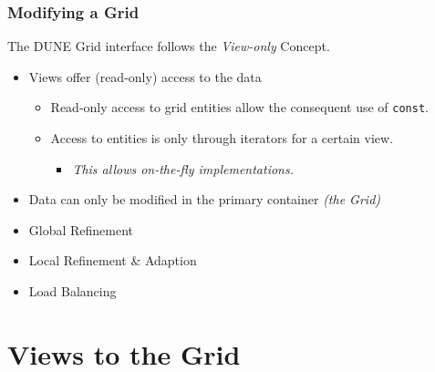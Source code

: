 \documentclass[aspectratio=169,11pt]{beamer}
\theoremstyle{definition}
\begin{document}
\begin{frame} \frametitle{Modifying a Grid}
  The DUNE Grid interface follows the \emph{View-only} Concept.
  \pause
  \begin{itemize}
  \item Views offer (read-only) access to the data
    \begin{itemize}
    \item Read-only access to grid entities allow the consequent use of
      \lstinline!const!.
    \item Access to entities is only through iterators for a
      certain view.
      \begin{itemize}
      \item[\rightarrownice] \emph{This allows on-the-fly implementations.}
      \end{itemize}
    \end{itemize}
  \item  Data can only be modified in the primary container \emph{(the Grid)}
  \end{itemize}
  \pause
  \begin{itemize}
  \item  Global Refinement

  \item  Local Refinement \& Adaption

  \item  Load Balancing
  \end{itemize}
\end{frame}

\section{Views to the Grid}
\end{document}
